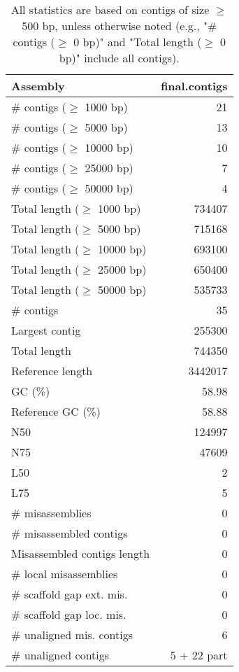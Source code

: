 \documentclass[12pt,a4paper]{article}
\begin{document}
\begin{table}[ht]
\begin{center}
\caption{All statistics are based on contigs of size $\geq$ 500 bp, unless otherwise noted (e.g., "\# contigs ($\geq$ 0 bp)" and "Total length ($\geq$ 0 bp)" include all contigs).}
\begin{tabular}{|l*{1}{|r}|}
\hline
Assembly & final.contigs \\ \hline
\# contigs ($\geq$ 1000 bp) & 21 \\ \hline
\# contigs ($\geq$ 5000 bp) & 13 \\ \hline
\# contigs ($\geq$ 10000 bp) & 10 \\ \hline
\# contigs ($\geq$ 25000 bp) & 7 \\ \hline
\# contigs ($\geq$ 50000 bp) & 4 \\ \hline
Total length ($\geq$ 1000 bp) & 734407 \\ \hline
Total length ($\geq$ 5000 bp) & 715168 \\ \hline
Total length ($\geq$ 10000 bp) & 693100 \\ \hline
Total length ($\geq$ 25000 bp) & 650400 \\ \hline
Total length ($\geq$ 50000 bp) & 535733 \\ \hline
\# contigs & 35 \\ \hline
Largest contig & 255300 \\ \hline
Total length & 744350 \\ \hline
Reference length & 3442017 \\ \hline
GC (\%) & 58.98 \\ \hline
Reference GC (\%) & 58.88 \\ \hline
N50 & 124997 \\ \hline
N75 & 47609 \\ \hline
L50 & 2 \\ \hline
L75 & 5 \\ \hline
\# misassemblies & 0 \\ \hline
\# misassembled contigs & 0 \\ \hline
Misassembled contigs length & 0 \\ \hline
\# local misassemblies & 0 \\ \hline
\# scaffold gap ext. mis. & 0 \\ \hline
\# scaffold gap loc. mis. & 0 \\ \hline
\# unaligned mis. contigs & 6 \\ \hline
\# unaligned contigs & 5 + 22 part \\ \hline

\end{tabular}
\end{center}
\end{table}
\end{document}
